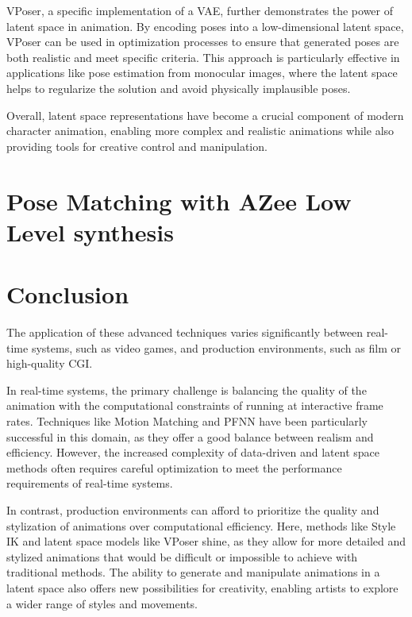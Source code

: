 \documentclass[../../main.tex]{subfiles}
\begin{document}
VPoser\cite{TODO}, a specific implementation of a VAE, further demonstrates the power of latent space in animation. By encoding poses into a low-dimensional latent space, VPoser can be used in optimization processes to ensure that generated poses are both realistic and meet specific criteria. This approach is particularly effective in applications like pose estimation from monocular images, where the latent space helps to regularize the solution and avoid physically implausible poses.

Overall, latent space representations have become a crucial component of modern character animation, enabling more complex and realistic animations while also providing tools for creative control and manipulation.

\section{Pose Matching with AZee Low Level synthesis}
\label{sec:pose_matching_with_azee}

\section{Conclusion}
\label{sec:conclusion}

The application of these advanced techniques varies significantly between real-time systems, such as video games, and production environments, such as film or high-quality CGI.

In real-time systems, the primary challenge is balancing the quality of the animation with the computational constraints of running at interactive frame rates. Techniques like Motion Matching and PFNN have been particularly successful in this domain, as they offer a good balance between realism and efficiency. However, the increased complexity of data-driven and latent space methods often requires careful optimization to meet the performance requirements of real-time systems.

In contrast, production environments can afford to prioritize the quality and stylization of animations over computational efficiency. Here, methods like Style IK and latent space models like VPoser shine, as they allow for more detailed and stylized animations that would be difficult or impossible to achieve with traditional methods. The ability to generate and manipulate animations in a latent space also offers new possibilities for creativity, enabling artists to explore a wider range of styles and movements.
\end{document}
